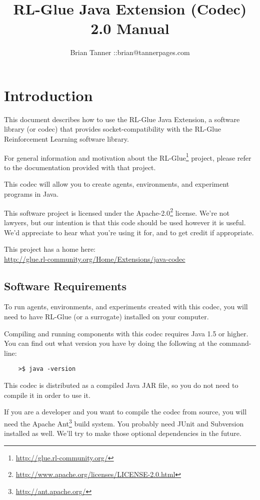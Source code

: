 \documentclass[11pt]{article}
\title{RL-Glue Java Extension (Codec) 2.0 Manual }
\author{Brian Tanner ::brian@tannerpages.com}
\begin{document}
\maketitle
\tableofcontents

\section{Introduction}

This document describes how to use the RL-Glue Java Extension, a software library (or codec) that provides socket-compatibility with the RL-Glue Reinforcement Learning software library.

For general information and motivation about the RL-Glue\footnote{\url{http://glue.rl-community.org/}} project, please refer to the documentation provided with that project.

This codec will allow you to create agents, environments, and experiment programs in Java.

This software project is licensed under the Apache-2.0\footnote{\url{http://www.apache.org/licenses/LICENSE-2.0.html}} license. We're not lawyers, but our intention is that this code 
should be used however it is useful.  We'd appreciate to hear what you're using it for, and to get credit if appropriate.

This project has a home here:\\
\url{http://glue.rl-community.org/Home/Extensions/java-codec}



\subsection{Software Requirements}
To run agents, environments, and experiments created with this codec, you will need to have RL-Glue (or a surrogate) installed on your computer.

Compiling and running components with this codec requires Java 1.5 or higher. You can find out what version you have by doing the following at the command-line:
\begin{verbatim}
	>$ java -version
\end{verbatim}

This codec is distributed as a compiled Java JAR file, so you do not need to compile it in order to use it.

If you are a developer and you want to compile the codec from source, you will need the Apache Ant\footnote{\url{http://ant.apache.org/}} build system.  You probably need JUnit and Subversion installed as well. We'll try to make those optional dependencies in the future.
\end{document}
